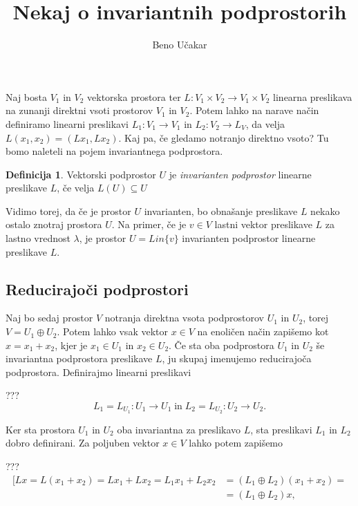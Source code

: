 \documentclass[a4paper,12pt]{article}
\title{Nekaj o invariantnih podprostorih}
\author{Beno Učakar}
\date{}
\theoremstyle{definition}
\newtheorem{definicija}{Definicija}
\begin{document}
\maketitle
Naj bosta $V_1$ in $V_2$ vektorska prostora ter $L \colon V_1 \times V_2 \to V_1 \times V_2$ linearna preslikava na zunanji direktni vsoti prostorov $V_1$ in $V_2$.
Potem lahko na narave način definiramo linearni preslikavi $L_1 \colon V_1 \to V_1$ in $L_2 \colon V_2 \to L_V$, da velja  
\(L(x_1, x_2) = (Lx_1, Lx_2).\)
Kaj pa, če gledamo notranjo direktno vsoto? Tu bomo naleteli na pojem invariantnega podprostora.

    \begin{definicija}
    Vektorski podprostor $U$ je \emph{invarianten podprostor} linearne preslikave $L$, če velja 
    $L(U) \subseteq U$
    \end{definicija}

Vidimo torej, da če je prostor $U$ invarianten, bo obnašanje preslikave $L$ nekako ostalo znotraj prostora $U$.
Na primer, če je $v \in V$ lastni vektor preslikave $L$ za lastno vrednost $\lambda$, je prostor 
\(U = Lin \{ v \}\) invarianten podprostor linearne preslikave $L$.

\subsection*{Reducirajoči podprostori}

Naj bo sedaj prostor $V$ notranja direktna vsota podprostorov $U_1$ in $U_2$, torej $V = U_1 \oplus U_2$.
Potem lahko vsak vektor $x \in V$ na enoličen način zapišemo kot $x = x_1 + x_2$, kjer je $x_1 \in U_1$ in $x_2 \in U_2$.
Če sta oba podprostora $U_1$ in $U_2$ še invariantna podprostora preslikave $L$, ju skupaj imenujemo reducirajoča podprostora.
Definirajmo linearni preslikavi 

???
\[L_1 = L _{U_1} \colon U_1 \to U_1  \;\text{in}\;  L_2 = L _{U_2} \colon U_2 \to U_2.\]

Ker sta prostora $U_1$ in $U_2$ oba invariantna za preslikavo $L$, sta preslikavi $L_1$ in $L_2$ dobro definirani.
Za poljuben vektor $x \in V$ lahko potem zapišemo 

???
\begin{align*}
    [Lx = L(x_1 + x_2) = Lx_1+ Lx_2 = L_1x_1 + L_2x_2 &= (L_1 \oplus L_2)(x_1 + x_2) =\\ &=(L_1 \oplus L_2)x,\end{align*}
\end{document}
